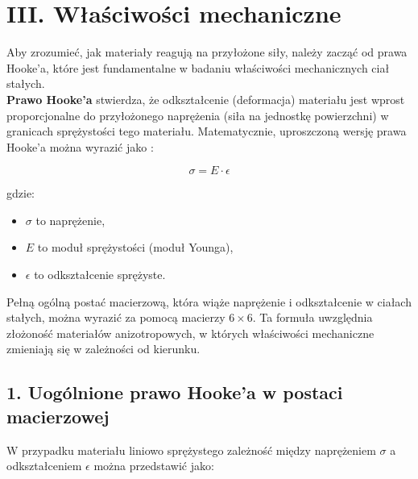 {}
\justify
\fontsize{14}{16}\selectfont
\setlength{\parindent}{0pt}
\chapter*{III. Właściwości mechaniczne \cite{alma991000386409708832, kittel1976wstep, alma991001031769708832, alma991053253943408832}} 
\fontsize{12}{14}\selectfont
\vspace{\baselineskip} 

\hspace{1.5cm} Aby zrozumieć, jak materiały reagują na przyłożone siły, należy zacząć od prawa Hooke'a, które jest fundamentalne w badaniu właściwości mechanicznych ciał stałych. \\
\hspace{1.5cm} \textbf{Prawo Hooke'a} stwierdza, że odkształcenie (deformacja) materiału jest wprost proporcjonalne do przyłożonego naprężenia (siła na jednostkę powierzchni) w granicach sprężystości tego materiału. Matematycznie, uproszczoną wersję prawa Hooke'a można wyrazić jako \cite{alma991053253943408832, alma991000386409708832}:

$$
\sigma = E \cdot \epsilon
$$

gdzie:
\begin{itemize}
 \item  $\sigma$ to naprężenie,
 \item  $E$ to moduł sprężystości (moduł Younga),
 \item  $\epsilon$ to odkształcenie sprężyste.
\end{itemize}


Pełną ogólną postać macierzową, która wiąże naprężenie i odkształcenie w ciałach stałych, można wyrazić za pomocą macierzy $6 \times 6$. Ta formuła uwzględnia złożoność materiałów anizotropowych, w których właściwości mechaniczne zmieniają się w zależności od kierunku.
{}
\section*{1. Uogólnione prawo Hooke'a w postaci macierzowej \cite{kittel1976wstep, alma991001031769708832}}
\vspace{-1.0em}
\label{sec:spacing_font_size}
\hspace{1.5cm} W przypadku materiału liniowo sprężystego zależność między naprężeniem $\sigma$ a odkształceniem $\epsilon$ można przedstawić jako:

